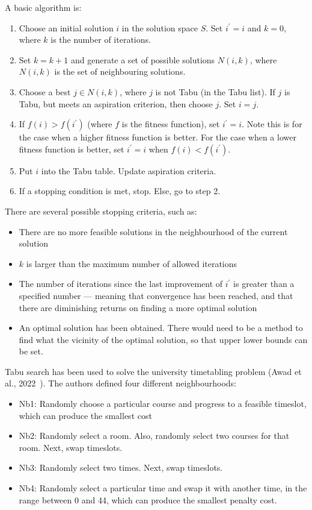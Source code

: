 A basic algorithm is:
\begin{enumerate}
	\item Choose an initial solution \( i \) in the solution space \( S \).
		Set \( i^\prime=i \) and \( k = 0 \), where \( k \) is the number of
		iterations.
	\item Set \( k = k + 1 \) and generate a set of possible solutions
		\( N(i,k) \), where \( N(i,k) \) is the set of neighbouring solutions.
	\item Choose a best \( j \in N(i,k) \), where \( j \) is not Tabu (in the
		Tabu list).
		If \( j \) is Tabu, but meets an aspiration criterion, then choose
		\( j \).
		Set \( i = j \).
	\item If \( f(i) > f(i^\prime) \) (where \( f \) is the fitness function),
		set \( i^\prime = i \).
		Note this is for the case when a higher fitness function is better.
		For the case when a lower fitness function is better, set
		\( i^\prime = i \) when \( f(i) < f(i^\prime) \).
	\item Put \( i \) into the Tabu table. Update aspiration criteria.
	\item If a stopping condition is met, stop. Else, go to step 2.
\end{enumerate}
There are several possible stopping criteria, such as:
\begin{itemize}
	\item There are no more feasible solutions in the neighbourhood of the
		current solution
	\item \( k \) is larger than the maximum number of allowed iterations
	\item The number of iterations since the last improvement of \( i^\prime \)
		is greater than a specified number --- meaning that convergence has been
		reached, and that there are diminishing returns on finding a more
		optimal solution
	\item An optimal solution has been obtained.
		There would need to be a method to find what the vicinity of the optimal
		solution, so that upper lower bounds can be set.
\end{itemize}
Tabu search has been used to solve the university timetabling
problem (Awad et al., 2022~\cite{tabu_example}).
The authors defined four different neighbourhoods:
\begin{itemize}
	\item Nb1: Randomly choose a particular course and progress to a feasible
		timeslot, which can produce the smallest cost
	\item Nb2: Randomly select a room. Also, randomly select two courses for
		that room. Next, swap timeslots.
	\item Nb3: Randomly select two times. Next, swap timeslots.
	\item Nb4: Randomly select a particular time and swap it with another time,
		in the range between 0 and 44, which can produce the smallest penalty
		cost.
\end{itemize}
